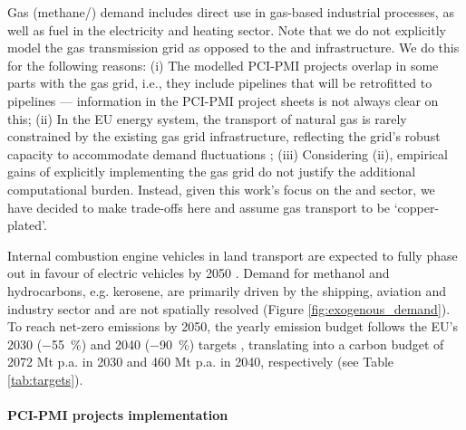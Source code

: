 \documentclass[preprint,12pt,sort&compress]{elsarticle}
\begin{document}
Gas (methane/) demand includes direct use in gas-based industrial processes, as well as fuel in the electricity and heating sector. Note that we do not explicitly model the gas transmission grid as opposed to the  and  infrastructure. We do this for the following reasons: (i) The modelled PCI-PMI projects overlap in some parts with the gas grid, i.e., they include  pipelines that will be retrofitted to  pipelines --- information in the PCI-PMI project sheets is not always clear on this; (ii) In the EU energy system, the transport of natural gas is rarely constrained by the existing gas grid infrastructure, reflecting the grid's robust capacity to accommodate demand fluctuations \cite{riepinModellingUncertaintyCoupled2021}; (iii) Considering (ii), empirical gains of explicitly implementing the gas grid do not justify the additional computational burden. 
Instead, given this work's focus on the  and  sector, we have decided to make trade-offs here and assume gas transport to be `copper-plated'.

Internal combustion engine vehicles in land transport are expected to fully phase out in favour of electric vehicles by 2050 \cite{zeyenShiftingBurdensHow2025a}. Demand for methanol and hydrocarbons, e.g. kerosene, are primarily driven by the shipping, aviation and industry sector and are not spatially resolved (Figure \ref{fig:exogenous_demand}).
To reach net-zero  emissions by 2050, the yearly emission budget follows the EU's 2030 (\SI{-55}{\percent}) and 2040 (\SI{-90}{\percent}) targets \cite{europeancommissionFit55Delivering2021, europeancommission.directorategeneralforclimateaction.IndepthReportResults2024}, translating into a carbon budget of 2072 Mt p.a. in 2030 and 460 Mt p.a. in 2040, respectively (see Table \ref{tab:targets}).

\paragraph{PCI-PMI projects implementation}
\label{sec:pci-pmi_projects_implementation}
\end{document}
